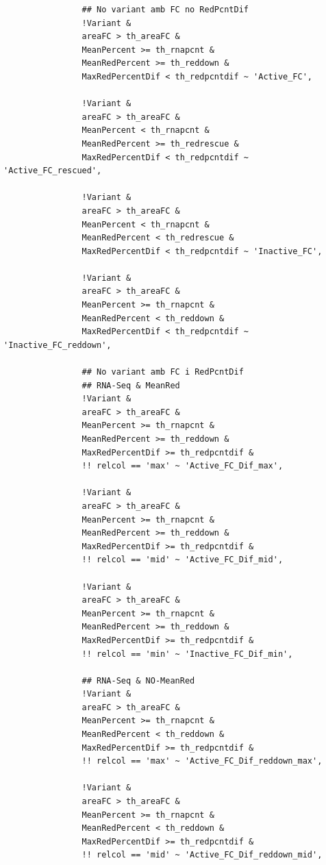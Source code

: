 \documentclass[11pt]{article}
\begin{document}
\begin{verbatim}
                ## No variant amb FC no RedPcntDif
                !Variant &
                areaFC > th_areaFC &
                MeanPercent >= th_rnapcnt &
                MeanRedPercent >= th_reddown &
                MaxRedPercentDif < th_redpcntdif ~ 'Active_FC',

                !Variant &
                areaFC > th_areaFC &
                MeanPercent < th_rnapcnt &
                MeanRedPercent >= th_redrescue &
                MaxRedPercentDif < th_redpcntdif ~ 'Active_FC_rescued',

                !Variant &
                areaFC > th_areaFC &
                MeanPercent < th_rnapcnt &
                MeanRedPercent < th_redrescue &
                MaxRedPercentDif < th_redpcntdif ~ 'Inactive_FC',

                !Variant &
                areaFC > th_areaFC &
                MeanPercent >= th_rnapcnt &
                MeanRedPercent < th_reddown &
                MaxRedPercentDif < th_redpcntdif ~ 'Inactive_FC_reddown',

                ## No variant amb FC i RedPcntDif
                ## RNA-Seq & MeanRed
                !Variant &
                areaFC > th_areaFC &
                MeanPercent >= th_rnapcnt &
                MeanRedPercent >= th_reddown &
                MaxRedPercentDif >= th_redpcntdif &
                !! relcol == 'max' ~ 'Active_FC_Dif_max',

                !Variant &
                areaFC > th_areaFC &
                MeanPercent >= th_rnapcnt &
                MeanRedPercent >= th_reddown &
                MaxRedPercentDif >= th_redpcntdif &
                !! relcol == 'mid' ~ 'Active_FC_Dif_mid',

                !Variant &
                areaFC > th_areaFC &
                MeanPercent >= th_rnapcnt &
                MeanRedPercent >= th_reddown &
                MaxRedPercentDif >= th_redpcntdif &
                !! relcol == 'min' ~ 'Inactive_FC_Dif_min',

                ## RNA-Seq & NO-MeanRed
                !Variant &
                areaFC > th_areaFC &
                MeanPercent >= th_rnapcnt &
                MeanRedPercent < th_reddown &
                MaxRedPercentDif >= th_redpcntdif &
                !! relcol == 'max' ~ 'Active_FC_Dif_reddown_max',

                !Variant &
                areaFC > th_areaFC &
                MeanPercent >= th_rnapcnt &
                MeanRedPercent < th_reddown &
                MaxRedPercentDif >= th_redpcntdif &
                !! relcol == 'mid' ~ 'Active_FC_Dif_reddown_mid',


\end{verbatim}
\end{document}
